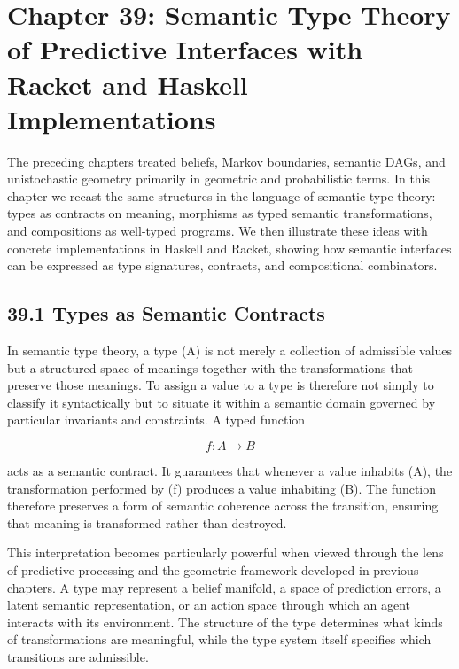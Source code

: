 \documentclass[12pt,letterpaper]{article}
\theoremstyle{remark}
\begin{document}
\newpage

\section{Chapter 39: Semantic Type Theory of Predictive Interfaces  
with Racket and Haskell Implementations}

The preceding chapters treated beliefs, Markov boundaries, semantic DAGs, and unistochastic geometry primarily in geometric and probabilistic terms. In this chapter we recast the same structures in the language of semantic type theory: types as contracts on meaning, morphisms as typed semantic transformations, and compositions as well-typed programs. We then illustrate these ideas with concrete implementations in Haskell and Racket, showing how semantic interfaces can be expressed as type signatures, contracts, and compositional combinators.

\subsection{39.1 Types as Semantic Contracts}

In semantic type theory, a type (A) is not merely a collection of admissible values but a structured space of meanings together with the transformations that preserve those meanings. To assign a value to a type is therefore not simply to classify it syntactically but to situate it within a semantic domain governed by particular invariants and constraints. A typed function

\[
f : A \to B
\]

acts as a semantic contract. It guarantees that whenever a value inhabits (A), the transformation performed by (f) produces a value inhabiting (B). The function therefore preserves a form of semantic coherence across the transition, ensuring that meaning is transformed rather than destroyed.

This interpretation becomes particularly powerful when viewed through the lens of predictive processing and the geometric framework developed in previous chapters. A type may represent a belief manifold, a space of prediction errors, a latent semantic representation, or an action space through which an agent interacts with its environment. The structure of the type determines what kinds of transformations are meaningful, while the type system itself specifies which transitions are admissible.
\end{document}
